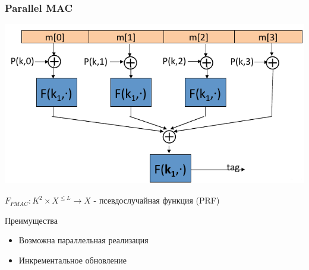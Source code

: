 \documentclass{beamer}
\begin{document}
\begin{frame}
  \frametitle{Parallel MAC}

  \includegraphics[width=\linewidth]{./images/png/PMAC.png}

  $F_{PMAC}:K^{2} \times X^{\le L} \rightarrow X$ - псевдослучайная функция (PRF)

  \begin{block}{Преимущества}
    \begin{itemize}
      \item{Возможна параллельная реализация}
      \item{Инкрементальное обновление}
    \end{itemize}
  \end{block}
\end{frame}
\end{document}
